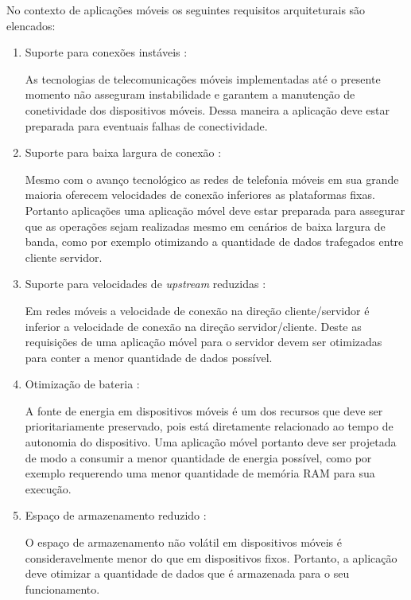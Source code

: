 \documentclass[
	article,			%
	11pt,				%
	oneside,			%
	a4paper,			%
	english,			%
	brazil,				%
	sumario=tradicional
]{abntex2}
\begin{document}
No contexto de aplicações móveis os seguintes requisitos arquiteturais são elencados:
\begin{enumerate}
	\item Suporte para conexões instáveis \cite{rathore2007overview}:
	
	As tecnologias de telecomunicações móveis implementadas até o presente momento não asseguram instabilidade e garantem a manutenção de conetividade dos dispositivos móveis. Dessa maneira a aplicação deve estar preparada para eventuais falhas de conectividade.
	
	\item Suporte para baixa largura de conexão \cite{rathore2007overview}:
	
	Mesmo com o avanço tecnológico as redes de telefonia móveis em sua grande maioria oferecem velocidades de conexão inferiores as plataformas fixas. Portanto aplicações uma aplicação móvel deve estar preparada para assegurar que as operações sejam realizadas mesmo em cenários de baixa largura de banda, como por exemplo otimizando a quantidade de dados trafegados entre cliente servidor.
	
	\item Suporte para velocidades de \emph{upstream} reduzidas \cite{rathore2007overview}:
	
	Em redes móveis a velocidade de conexão na direção cliente/servidor é inferior a velocidade de conexão na direção servidor/cliente. Deste as requisições de uma aplicação móvel para o servidor devem ser otimizadas para conter a menor quantidade de dados possível.
	
	\item Otimização de bateria \cite{rathore2007overview}:
	
	A fonte de energia em dispositivos móveis é um dos recursos que deve ser prioritariamente preservado, pois está diretamente relacionado ao tempo de autonomia do dispositivo. Uma aplicação móvel portanto deve ser projetada de modo a consumir a menor quantidade de energia possível, como por exemplo requerendo uma menor quantidade de memória RAM para sua execução.
	
	\item Espaço de armazenamento reduzido \cite{tiffany2008guide}:
	
	O espaço de armazenamento não volátil em dispositivos móveis é consideravelmente menor do que em dispositivos fixos. Portanto, a aplicação deve otimizar a quantidade de dados que é armazenada para o seu funcionamento.
	
\end{enumerate}
\end{document}
